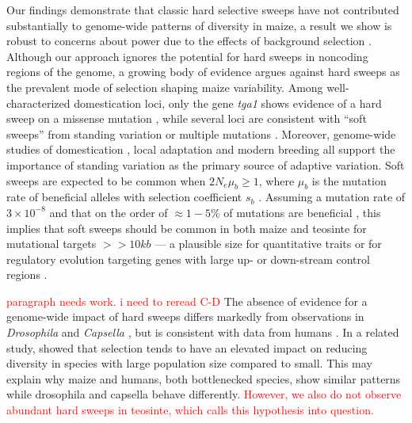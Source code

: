\documentclass{pnastwo}
\newcommand{\jri}[1]{\textcolor{red}{\scriptsize #1}}
\begin{document}
\begin{article}
Our findings demonstrate that classic hard selective sweeps have not contributed substantially to genome-wide patterns of diversity in maize, a result we show is robust to concerns about power due to the effects of background selection  \cite{enard2014}. 
Although our approach ignores the potential for hard sweeps in noncoding regions of the genome, a growing body of evidence argues against hard sweeps as the prevalent mode of selection shaping maize variability. 
Among well-characterized domestication loci, only the gene \emph{tga1} shows evidence of a hard sweep on a missense mutation \cite{wang2015}, while several loci are consistent with ``soft sweeps''  from standing variation \cite{studer2011,gallavotti2004role} or multiple mutations \cite{wills2013}. 
Moreover, genome-wide studies of domestication \cite{hufford2012},  local adaptation \cite{Takuno15062015} and modern breeding \cite{beissinger2014} all support the importance of standing variation as the primary source of adaptive variation. 
Soft sweeps are expected to be common when $2N_e\mu_b \ge 1$, where $\mu_b$ is the mutation rate of beneficial alleles with selection coefficient $s_b$ \cite{messer2013population}.  
Assuming a mutation rate of $3 \times 10^{-8}$ \citep{clark2005} and that on the order of $\approx 1-5\%$ of mutations are beneficial \citep{eyre2007distribution}, this implies that soft sweeps should be common in both maize and teosinte for mutational targets $>>10kb$ --- a plausible size for quantitative traits or for regulatory evolution targeting genes with large up- or down-stream control regions \citep[e.g.][]{studer2011}.

\jri{paragraph needs work. i need to reread C-D}
The absence of evidence for a genome-wide impact of hard sweeps differs markedly from observations in \emph{Drosophila} \cite{sattath2011} and \emph{Capsella} \cite{williamson2014}, but is consistent with data from humans \cite{hernandez2011,pritchard2010genetics}. 
In a related study, \cite{corbett2015} showed that selection tends to have an elevated impact on reducing diversity in species with large population size compared to small. This may explain why maize and humans, both bottlenecked species, show similar patterns while drosophila and capsella behave differently. \textcolor{red}{However, we also do not observe abundant hard sweeps in teosinte, which calls this hypothesis into question.}





\end{article}
\end{document}
